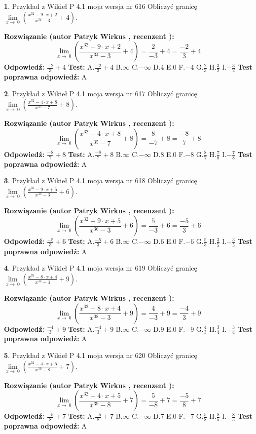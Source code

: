 \documentclass[12pt, a4paper]{article}
\theoremstyle{definition} %
\newtheorem{zad}{}
\newcommand{\zadStart}[1]{\begin{zad}#1\newline}
\newcommand{\zadStop}{\end{zad}}
\newcommand{\rozwStart}[2]{\noindent \textbf{Rozwiązanie (autor #1 , recenzent #2): }\newline}
\newcommand{\rozwStop}{\newline}
\newcommand{\odpStart}{\noindent \textbf{Odpowiedź:}\newline}
\newcommand{\odpStop}{\newline}
\newcommand{\testStart}{\noindent \textbf{Test:}\newline}
\newcommand{\testStop}{\newline}
\newcommand{\kluczStart}{\noindent \textbf{Test poprawna odpowiedź:}\newline}
\newcommand{\kluczStop}{\newline}
\begin{document}
\zadStart{Przykład z Wikieł P 4.1 moja wersja nr 616}
Obliczyć granicę $\lim\limits_{x\to\ 0}(\frac{x^{32}-9 \cdot x +2}{x^{34}-3}+4)$.
\zadStop
\rozwStart{Patryk Wirkus}{}
$$\lim\limits_{x\to\ 0}(\frac{x^{32}-9 \cdot x +2}{x^{34}-3}+4)=\frac{2}{-3}+4=\frac{-2}{3}+4$$
\rozwStop
\odpStart
$\frac{-2}{3}+4$
\odpStop
\testStart
A.$\frac{-2}{3}+4$
B.$\infty$
C.$-\infty$
D.$4$
E.$0$
F.$-4$
G.$\frac{2}{3}$
H.$\frac{3}{2}$
I.$-\frac{3}{2}$
\testStop
\kluczStart
A
\kluczStop



\zadStart{Przykład z Wikieł P 4.1 moja wersja nr 617}
Obliczyć granicę $\lim\limits_{x\to\ 0}(\frac{x^{32}-4 \cdot x +8}{x^{35}-7}+8)$.
\zadStop
\rozwStart{Patryk Wirkus}{}
$$\lim\limits_{x\to\ 0}(\frac{x^{32}-4 \cdot x +8}{x^{35}-7}+8)=\frac{8}{-7}+8=\frac{-8}{7}+8$$
\rozwStop
\odpStart
$\frac{-8}{7}+8$
\odpStop
\testStart
A.$\frac{-8}{7}+8$
B.$\infty$
C.$-\infty$
D.$8$
E.$0$
F.$-8$
G.$\frac{8}{7}$
H.$\frac{7}{8}$
I.$-\frac{7}{8}$
\testStop
\kluczStart
A
\kluczStop



\zadStart{Przykład z Wikieł P 4.1 moja wersja nr 618}
Obliczyć granicę $\lim\limits_{x\to\ 0}(\frac{x^{32}-9 \cdot x +5}{x^{36}-3}+6)$.
\zadStop
\rozwStart{Patryk Wirkus}{}
$$\lim\limits_{x\to\ 0}(\frac{x^{32}-9 \cdot x +5}{x^{36}-3}+6)=\frac{5}{-3}+6=\frac{-5}{3}+6$$
\rozwStop
\odpStart
$\frac{-5}{3}+6$
\odpStop
\testStart
A.$\frac{-5}{3}+6$
B.$\infty$
C.$-\infty$
D.$6$
E.$0$
F.$-6$
G.$\frac{5}{3}$
H.$\frac{3}{5}$
I.$-\frac{3}{5}$
\testStop
\kluczStart
A
\kluczStop



\zadStart{Przykład z Wikieł P 4.1 moja wersja nr 619}
Obliczyć granicę $\lim\limits_{x\to\ 0}(\frac{x^{32}-8 \cdot x +4}{x^{38}-3}+9)$.
\zadStop
\rozwStart{Patryk Wirkus}{}
$$\lim\limits_{x\to\ 0}(\frac{x^{32}-8 \cdot x +4}{x^{38}-3}+9)=\frac{4}{-3}+9=\frac{-4}{3}+9$$
\rozwStop
\odpStart
$\frac{-4}{3}+9$
\odpStop
\testStart
A.$\frac{-4}{3}+9$
B.$\infty$
C.$-\infty$
D.$9$
E.$0$
F.$-9$
G.$\frac{4}{3}$
H.$\frac{3}{4}$
I.$-\frac{3}{4}$
\testStop
\kluczStart
A
\kluczStop



\zadStart{Przykład z Wikieł P 4.1 moja wersja nr 620}
Obliczyć granicę $\lim\limits_{x\to\ 0}(\frac{x^{32}-4 \cdot x +5}{x^{39}-8}+7)$.
\zadStop
\rozwStart{Patryk Wirkus}{}
$$\lim\limits_{x\to\ 0}(\frac{x^{32}-4 \cdot x +5}{x^{39}-8}+7)=\frac{5}{-8}+7=\frac{-5}{8}+7$$
\rozwStop
\odpStart
$\frac{-5}{8}+7$
\odpStop
\testStart
A.$\frac{-5}{8}+7$
B.$\infty$
C.$-\infty$
D.$7$
E.$0$
F.$-7$
G.$\frac{5}{8}$
H.$\frac{8}{5}$
I.$-\frac{8}{5}$
\testStop
\kluczStart
A
\kluczStop
\end{document}
